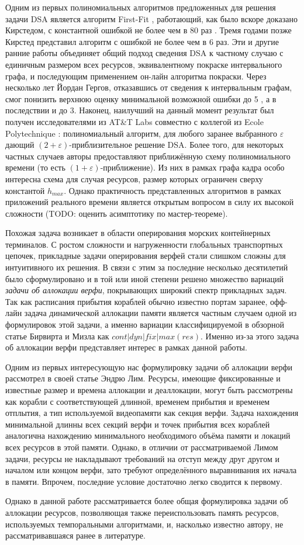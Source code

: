Одним из первых полиномиальных алгоритмов предложенных для решения задачи DSA является алгоритм First-Fit \cite{chrobak_packing_1988}, работающий, как было вскоре доказано Кирстедом, с константной ошибкой не более чем в 80 раз \cite{kierstead_linearity_1988}.
Тремя годами позже Кирстед представил алгоритм с ошибкой не более чем в 6 раз\cite{kierstead_polynomial_1991}.
Эти и другие ранние работы объединяет общий подход сведения DSA к частному случаю с единичным размером всех ресурсов, эквивалентному покраске интервального графа, и последующим применением он-лайн алгоритма покраски.
Через несколько лет Йордан Гергов, отказавшись от сведения к интервальным графам, смог понизить верхнюю оценку минимальной возможной ошибки до 5 \cite{gergov_approximation_1996}, а в последствии и до 3\cite{gergov_algorithms_1999}.
Наконец, наилучший на данный момент результат был получен исследователями из AT\&T Labs совместно с коллегой из Ecole Polytechnique \cite{buchsbaum_opt_2003}: полиномиальный алгоритм, для любого заранее выбранного $\varepsilon$ дающий $(2+\varepsilon)$-приблизительное решение DSA.
Более того, для некоторых частных случаев авторы предоставляют приближённую схему полиномиального времени (то есть $(1+\varepsilon)$-приближение).
Из них в рамках графа кадра особо интересна схема для случая ресурсов, размер которых ограничен сверху константой $h_{max}$.
Однако практичность представленных алгоритмов в рамках приложений реального времени является открытым вопросом в силу их высокой сложности (TODO: оценить асимптотику по мастер-теореме).

Похожая задача возникает в области оперирования морских контейнерных терминалов.
С ростом сложности и нагруженности глобальных транспортных цепочек, прикладные задачи оперирования верфей стали слишком сложны для интуитивного их решения.
В связи с этим за последние несколько десятилетий было сформулировано и в той или иной степени решено множество вариаций \textit{задачи об аллокации верфи}, покрывающих широкий спектр прикладных задач.
Так как расписания прибытия кораблей обычно известно портам заранее, офф-лайн задача динамической аллокации памяти является частным случаем одной из формулировок этой задачи, а именно вариации классифицируемой в обзорной статье Бирвирта и Мизла\cite{BIERWIRTH2010615} как $cont|dyn|fix|max(res)$.
Именно из-за этого задача об аллокации верфи представляет интерес в рамках данной работы.

Одним из первых интересующую нас формулировку задачи об аллокации верфи рассмотрел в своей статье Эндрю Лим\cite{LIM1998105}.
Ресурсы, имеющие фиксированные и известные размер и времена аллокации и деаллокации, могут быть рассмотрены как корабли с соответствующей длинной, временем прибытия и временем отплытия, а тип используемой видеопамяти как секция верфи.
Задача нахождения минимальной длинны всех секций верфи и точек прибытия всех кораблей аналогична нахождению минимального необходимого объёма памяти и локаций всех ресурсов в этой памяти.
Однако, в отличии от рассматриваемой Лимом задачи, ресурсы не накладывают требований на отступ между друг другом и началом или концом верфи, зато требуют определённого выравнивания их начала в памяти.
Впрочем, последние условие достаточно легко сводится к первому.

Однако в данной работе рассматривается более общая формулировка задачи об аллокации ресурсов, позволяющая также переиспользовать память ресурсов, используемых темпоральными алгоритмами, и, насколько известно автору, не рассматривавшаяся ранее в литературе.
